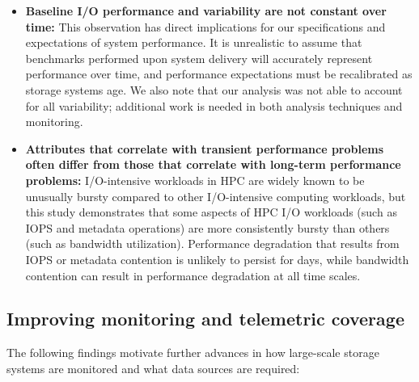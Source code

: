\begin{itemize}[leftmargin=*]

\item \textbf{Baseline I/O performance and variability are not constant over
time:}
This observation has direct implications for our specifications and expectations of system performance.
It is unrealistic to assume that benchmarks performed upon system delivery
will accurately represent performance over time, and performance
expectations must be recalibrated as storage systems age.  We also note that
our analysis was not able to account for all variability; additional work is
needed in both analysis techniques and monitoring.

\item \textbf{Attributes that correlate with transient performance problems often differ from those that correlate with long-term performance problems:}
I/O-intensive workloads in HPC are widely known to be unusually bursty compared to other I/O-intensive computing workloads, but this study demonstrates that some aspects of HPC I/O workloads (such as IOPS and metadata operations) are more consistently bursty than others (such as bandwidth utilization).
Performance degradation that results from IOPS or metadata contention is unlikely to persist for days, while bandwidth contention can result in performance degradation at all time scales.

\end{itemize}


\subsection{Improving monitoring and telemetric coverage}

The following findings motivate further advances in how large-scale storage systems are monitored and what data sources are required:


